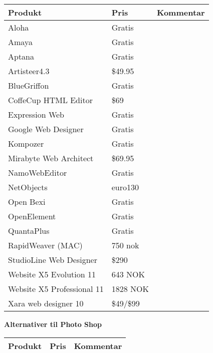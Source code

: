 \label{sec:opensource}
\begin{center}
\begin{tabular}{ | m{4cm} | m{2cm}| m{8cm} | } 
 \hline
\textbf{Produkt} & \textbf{Pris} & \textbf{Kommentar} \\ 
\hline
{\color {green} Aloha } & Gratis & \\
\hline
{\color{red} Amaya } & Gratis & \\
\hline
{\color {red}Aptana } & Gratis & \\
\hline
{\color{red} Artisteer4.3} & \$49.95 & \\
\hline 
{\color {green} BlueGriffon} & Gratis & 
\\
\hline
{\color{red} CoffeCup HTML Editor}  & \$69 & 
\\
\hline
{\color{red} Expression Web } & Gratis &  \\
\hline
{\color{red} Google Web Designer} & Gratis &  \\
\hline
{\color{red} Kompozer} & Gratis & \\
\hline
{\color{red} Mirabyte Web Architect } & \$69.95 &  \\
\hline
{\color{red} NamoWebEditor} & Gratis &\\
\hline
{\color{red} NetObjects } & euro130 &  \\
\hline
{\color {green} Open Bexi } & Gratis & 

 \\
\hline
{\color {green} OpenElement} & Gratis & \\
\hline
{\color {green} QuantaPlus} & Gratis &\\
\hline
{\color{red} RapidWeaver (MAC)} & 750 nok &   \\
\hline
{\color{red} StudioLine Web Designer } & \$290 & \\
\hline
{\color{red} Website X5 Evolution 11 } & 643 NOK &  \\
\hline
{\color{red} Website X5 Professional 11} & 1828 NOK & \\
\hline 
{\color{red} Xara web designer 10 } & \$49/\$99 &  \\
\hline

\end{tabular}
\newpage


\textbf{Alternativer til Photo Shop}

\begin{tabular}{ | m{4cm} | m{2cm}| m{8cm} | } 
\hline
\textbf{Produkt} & \textbf{Pris} & \textbf{Kommentar} \\
\hline








\end{tabular}
\end{center}

